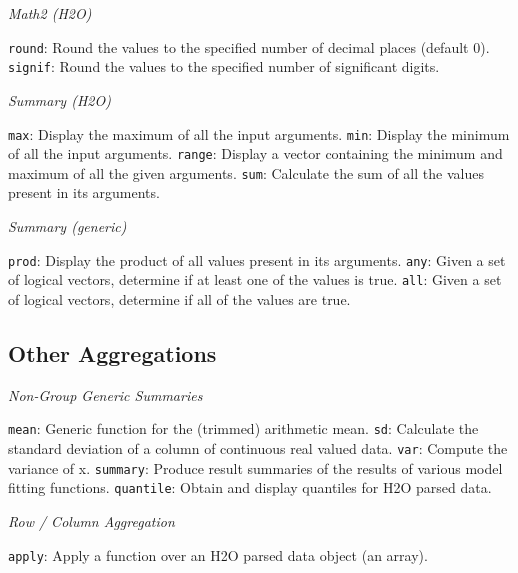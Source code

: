 \documentclass[11pt]{article}
\begin{document}
{\emph{Math2 (H2O)}\par
{\texttt{round}}: Round the values to the specified number of decimal places (default 0). \newline
{\texttt{signif}}: Round the values to the specified number of significant digits.\newline

\emph{Summary (H2O)}\par
{\texttt{max}}: Display the maximum of all the input arguments. \newline
{\texttt{min}}: Display the minimum of all the input arguments. \newline
{\texttt{range}}: Display a vector containing the minimum and maximum of all the given arguments. \newline
{\texttt{sum}}: Calculate the sum of all the values present in its arguments.\newline

\emph{Summary (generic)}\par
{\texttt{prod}}: Display the product of all values present in its arguments. \newline
{\texttt{any}}: Given a set of logical vectors, determine if at least one of the values is true. \newline
{\texttt{all}}: Given a set of logical vectors, determine if all of the values are true.\newline

\subsection{Other Aggregations}

\emph{Non-Group Generic Summaries}\par
{\texttt{mean}}: Generic function for the (trimmed) arithmetic mean. \newline
{\texttt{sd}}: Calculate the standard deviation of a column of continuous real valued data. \newline
{\texttt{var}}: Compute the variance of x.\newline
{\texttt{summary}}: Produce result summaries of the results of various model fitting functions. \newline
{\texttt{quantile}}: Obtain and display quantiles for H2O parsed data.\newline

\emph{Row / Column Aggregation}\par
{\texttt{apply}: Apply a function over an H2O parsed data object (an array).\newline

}}
\end{document}
